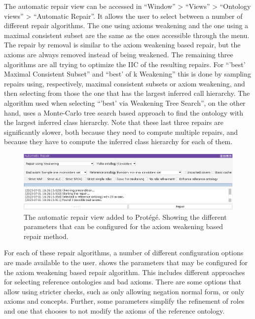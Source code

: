 The automatic repair view can be accessed in ``Window'' > ``Views'' > ``Ontology views'' > ``Automatic Repair''. It allows the user to select between a number of different repair algorithms. The one using axioms weakening and the one using a maximal consistent subset are the same as the ones accessible through the menu. The repair by removal is similar to the axiom weakening based repair, but the axioms are always removed instead of being weakened. The remaining three algorithms are all trying to optimize the IIC of the resulting repairs. For ``'best' Maximal Consistent Subset'' and ``best' of k Weakening'' this is done by sampling repairs using, respectively, maximal consistent subsets or axiom weakening, and then selecting from those the one that has the largest inferred call hierarchy. The algorithm used when selecting ``'best' via Weakening Tree Search'', on the other hand, uses a Monte-Carlo tree search based approach to find the ontology with the largest inferred class hierarchy. Note that these last three repairs are significantly slower, both because they need to compute multiple repairs, and because they have to compute the inferred class hierarchy for each of them.

\begin{figure}[htbp]
  \centering
  \includegraphics[width=\textwidth]{resources/protege-guide-config.png}
  \caption{The automatic repair view added to Protégé. Showing the different parameters that can be configured for the axiom weakening based repair method.}
  \label{fig:protege-guide-config}
\end{figure}

For each of these repair algorithms, a number of different configuration options are made available to the user.  shows the parameters that may be configured for the axiom weakening based repair algorithm. This includes different approaches for selecting reference ontologies and bad axioms. There are some options that allow using stricter checks, such as only allowing negation normal form, or only \ALC axioms and concepts. Further, some parameters simplify the refinement of roles and one that chooses to not modify the axioms of the reference ontology.

